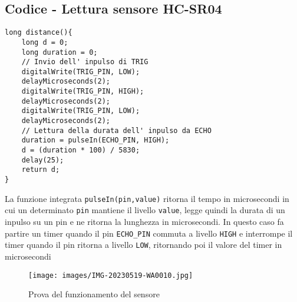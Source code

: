\subsection{Codice - Lettura sensore HC-SR04}
\begin{lstlisting}[frame=single, language=Arduino]
long distance(){
    long d = 0;
    long duration = 0;
    // Invio dell' inpulso di TRIG
    digitalWrite(TRIG_PIN, LOW);
    delayMicroseconds(2);
    digitalWrite(TRIG_PIN, HIGH);
    delayMicroseconds(2);
    digitalWrite(TRIG_PIN, LOW);
    delayMicroseconds(2);
    // Lettura della durata dell' inpulso da ECHO
    duration = pulseIn(ECHO_PIN, HIGH);
    d = (duration * 100) / 5830;
    delay(25);
    return d;
}
\end{lstlisting}
\clearpage
\noindent La funzione integrata \texttt{pulseIn(pin,value)} ritorna il tempo in microsecondi in cui un determinato \texttt{pin} mantiene il livello \texttt{value}, legge quindi la durata di un inpulso su un pin e ne ritorna la lunghezza in microsecondi. In questo caso fa partire un timer quando il pin \texttt{ECHO\_PIN} commuta a livello \texttt{HIGH} e interrompe il timer quando il pin ritorna a livello \texttt{LOW}, ritornando poi il valore del timer in microsecondi
\begin{figure}[H]
    \centering
    \texttt{[image: images/IMG-20230519-WA0010.jpg]}
    \caption{Prova del funzionamento del sensore}
\end{figure}